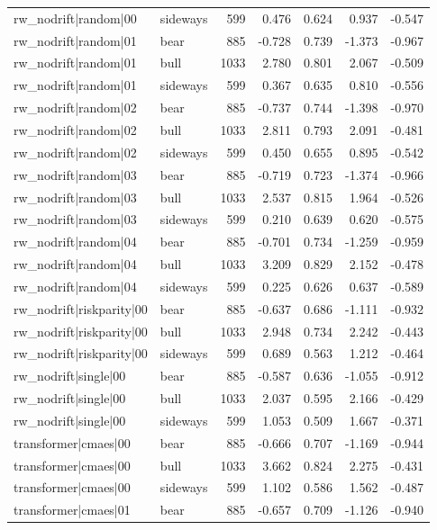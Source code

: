 \begin{table}
\begin{tabular}{llrrrrr}
rw\_nodrift|random|00 & sideways & 599 & 0.476 & 0.624 & 0.937 & -0.547 \\
rw\_nodrift|random|01 & bear & 885 & -0.728 & 0.739 & -1.373 & -0.967 \\
rw\_nodrift|random|01 & bull & 1033 & 2.780 & 0.801 & 2.067 & -0.509 \\
rw\_nodrift|random|01 & sideways & 599 & 0.367 & 0.635 & 0.810 & -0.556 \\
rw\_nodrift|random|02 & bear & 885 & -0.737 & 0.744 & -1.398 & -0.970 \\
rw\_nodrift|random|02 & bull & 1033 & 2.811 & 0.793 & 2.091 & -0.481 \\
rw\_nodrift|random|02 & sideways & 599 & 0.450 & 0.655 & 0.895 & -0.542 \\
rw\_nodrift|random|03 & bear & 885 & -0.719 & 0.723 & -1.374 & -0.966 \\
rw\_nodrift|random|03 & bull & 1033 & 2.537 & 0.815 & 1.964 & -0.526 \\
rw\_nodrift|random|03 & sideways & 599 & 0.210 & 0.639 & 0.620 & -0.575 \\
rw\_nodrift|random|04 & bear & 885 & -0.701 & 0.734 & -1.259 & -0.959 \\
rw\_nodrift|random|04 & bull & 1033 & 3.209 & 0.829 & 2.152 & -0.478 \\
rw\_nodrift|random|04 & sideways & 599 & 0.225 & 0.626 & 0.637 & -0.589 \\
rw\_nodrift|riskparity|00 & bear & 885 & -0.637 & 0.686 & -1.111 & -0.932 \\
rw\_nodrift|riskparity|00 & bull & 1033 & 2.948 & 0.734 & 2.242 & -0.443 \\
rw\_nodrift|riskparity|00 & sideways & 599 & 0.689 & 0.563 & 1.212 & -0.464 \\
rw\_nodrift|single|00 & bear & 885 & -0.587 & 0.636 & -1.055 & -0.912 \\
rw\_nodrift|single|00 & bull & 1033 & 2.037 & 0.595 & 2.166 & -0.429 \\
rw\_nodrift|single|00 & sideways & 599 & 1.053 & 0.509 & 1.667 & -0.371 \\
transformer|cmaes|00 & bear & 885 & -0.666 & 0.707 & -1.169 & -0.944 \\
transformer|cmaes|00 & bull & 1033 & 3.662 & 0.824 & 2.275 & -0.431 \\
transformer|cmaes|00 & sideways & 599 & 1.102 & 0.586 & 1.562 & -0.487 \\
transformer|cmaes|01 & bear & 885 & -0.657 & 0.709 & -1.126 & -0.940 \\

\end{tabular}
\end{table}

